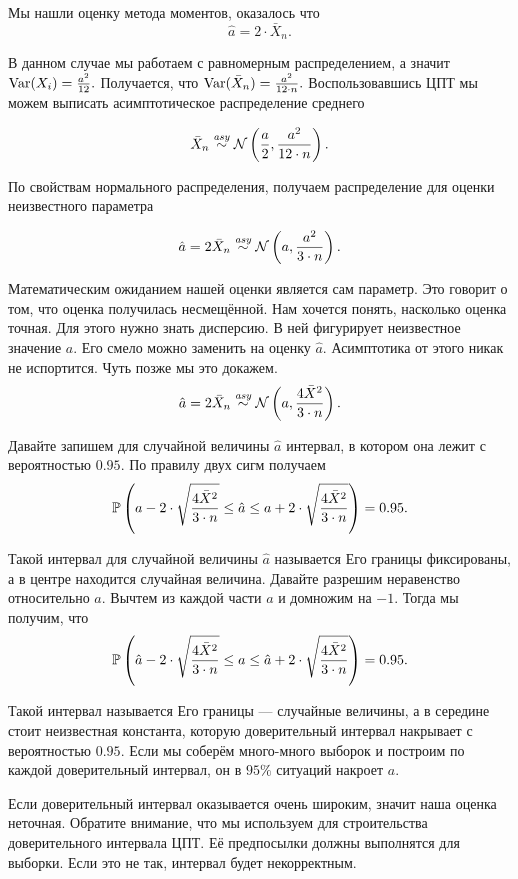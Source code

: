 \documentclass[12pt, a4paper, oneside]{article}
\begin{document}
\begin{sol}
Мы нашли оценку метода моментов, оказалось что 
\[ \hat{a} = 2 \cdot \bar{X}_{n}. \]

В данном случае мы работаем с равномерным распределением, а значит $\operatorname{Var}(X_i) = \frac{a^2}{12}.$ Получается, что $\operatorname{Var}(\bar X_n) = \frac{a^2}{12 \cdot n}.$ Воспользовавшись ЦПТ мы можем выписать асимптотическое распределение среднего 

\[\bar{X}_n \overset{\text{\textit{asy}}}{\sim} \mathcal{N} \left(\frac{a}{2}, \frac{a^2}{12 \cdot n} \right).\] 

По свойствам нормального распределения, получаем распределение для оценки неизвестного параметра

\[\hat{a}= 2 \bar{X}_{n} \overset{\text{\textit{asy}}}{\sim} \mathcal{N} \left(a, \frac{a^2}{3 \cdot n} \right).\] 

Математическим ожиданием нашей оценки является сам параметр. Это говорит о том, что оценка получилась несмещённой. Нам хочется понять, насколько оценка точная. Для этого нужно знать дисперсию. В ней фигурирует неизвестное значение $a$. Его смело можно заменить на оценку $\hat{a}$. Асимптотика от этого никак не испортится. Чуть позже мы это докажем. 
\[
\hat{a}= 2 \bar{X}_{n} \overset{\text{\textit{asy}}}{\sim} \mathcal{N} \left(a, \frac{4 \bar{X}^2}{3 \cdot n} \right).
\] 

Давайте запишем для случайной величины $\hat a$ интервал, в котором она лежит с вероятностью $0.95.$ По правилу двух сигм получаем
\[
\mathbb{P} \left(a - 2 \cdot \sqrt{\frac{4 \bar{X}^2}{3 \cdot n}}  \le \hat a \le a + 2 \cdot \sqrt{\frac{4 \bar{X}^2}{3 \cdot n}} \right) = 0.95.
\]

Такой интервал для случайной величины $\hat a$ называется  Его границы фиксированы, а в центре находится случайная величина. Давайте разрешим неравенство относительно $a$. Вычтем из каждой части $a$ и домножим на $-1.$ Тогда мы получим, что
\[
\mathbb{P} \left(\hat a - 2 \cdot \sqrt{\frac{4 \bar{X}^2}{3 \cdot n}}  \le a \le \hat a + 2 \cdot \sqrt{\frac{4 \bar{X}^2}{3 \cdot n}} \right) = 0.95.
\]

Такой интервал называется  Его границы --- случайные величины, а в середине стоит неизвестная константа, которую доверительный интервал накрывает с вероятностью $0.95$. Если мы соберём много-много выборок и построим по каждой доверительный интервал, он в $95\%$ ситуаций накроет $a$.

Если доверительный интервал оказывается очень широким, значит наша оценка неточная. Обратите внимание, что мы используем для строительства доверительного интервала ЦПТ. Её предпосылки должны выполнятся для выборки. Если это не так, интервал будет некорректным.


\end{sol}
\end{document}
